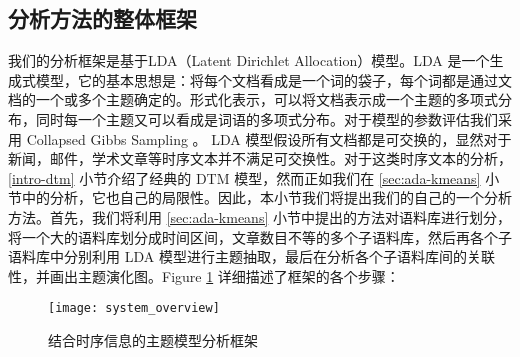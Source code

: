\subsection{分析方法的整体框架}
\label{sec:framework}
我们的分析框架是基于LDA（Latent Dirichlet Allocation）\cite{Blei:2003}模型。LDA 是一个生成式模型，它的基本思想是：将每个文档看成是一个词的袋子，每个词都是通过文档的一个或多个主题确定的。形式化表示，可以将文档表示成一个主题的多项式分布，同时每一个主题又可以看成是词语的多项式分布。对于模型的参数评估我们采用 Collapsed Gibbs Sampling \cite{griffiths2004finding, heinrich2005parameter}。 LDA 模型假设所有文档都是可交换的，显然对于新闻，邮件，学术文章等时序文本并不满足可交换性。对于这类时序文本的分析，\ref{intro-dtm} 小节介绍了经典的 DTM 模型，然而正如我们在 \ref{sec:ada-kmeans} 小节中的分析，它也自己的局限性。因此，本小节我们将提出我们的自己的一个分析方法。首先，我们将利用 \ref{sec:ada-kmeans} 小节中提出的方法对语料库进行划分，将一个大的语料库划分成时间区间，文章数目不等的多个子语料库，然后再各个子语料库中分别利用 LDA 模型进行主题抽取，最后在分析各个子语料库间的关联性，并画出主题演化图。Figure \ref{system-overview} 详细描述了框架的各个步骤：
\begin{figure}[htb]
	\texttt{[image: system\_overview]}
	\caption{结合时序信息的主题模型分析框架}
	\label{system-overview}
\end{figure}
